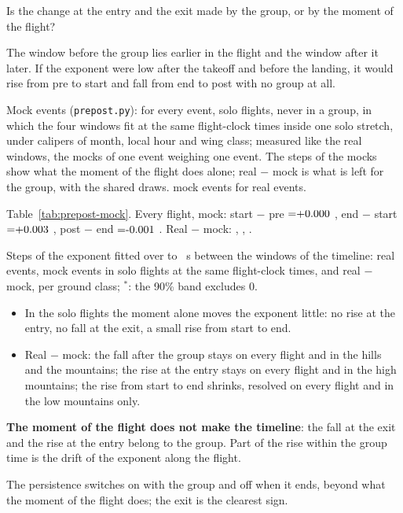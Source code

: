 \documentclass[10pt,a4paper]{article}
\newcommand{\Q}{\item[\textcolor{question}{\textbf{Q.}}]\color{question}}
\newcommand{\Res}{\item[\textcolor{answer}{\textbf{Result.}}]\color{black}}
\newcommand{\Home}{\item[\textcolor{answer}{\textbf{Take home.}}]\color{black}}
\newcommand{\Obs}{\item[\textcolor{answer}{\textbf{Observation.}}]\color{black}}
\newcommand{\Ded}{\item[\textcolor{answer}{\textbf{Deduction.}}]\color{black}}
\newcommand{\Why}{\item[\textcolor{black}{\textbf{Why.}}]\color{black}}
\newcommand{\Tool}{\item[\textcolor{black}{\textbf{Tool.}}]\color{black}}
\newenvironment{step}{\begin{description}[leftmargin=0pt, itemsep=7pt, topsep=8pt]}{\end{description}}
\begin{document}
\begin{step}
\Q Is the change at the entry and the exit made by the group, or by the moment of the flight?
\Why The window before the group lies earlier in the flight and the window after it later. If the exponent were
  low after the takeoff and before the landing, it would rise from pre to start and fall from end to post with no
  group at all.
\Tool Mock events (\texttt{prepost.py}): for every event, solo flights, never in a group, in which the four windows
  fit at the same flight-clock times inside one solo stretch, under calipers of month, local hour and wing class;
  measured like the real windows, the mocks of one event weighing one event. The steps of the mocks show what the
  moment of the flight does alone; real $-$ mock is what is left for the group, with the shared draws.
  \WhenMockEvents{} mock events for \WhenMockRealEvents{} real events.
\Res Table~\ref{tab:prepost-mock}. Every flight, mock: start $-$ pre $=\WhenMockAllStartMinusPre$
  \WhenMockAllStartMinusPreBand, end $-$ start $=\WhenMockAllEndMinusStart$ \WhenMockAllEndMinusStartBand, post $-$
  end $=\WhenMockAllPostMinusEnd$ \WhenMockAllPostMinusEndBand. Real $-$ mock: \WhenRealMinusMockAllStartMinusPre{}
  \WhenRealMinusMockAllStartMinusPreBand, \WhenRealMinusMockAllEndMinusStart{}
  \WhenRealMinusMockAllEndMinusStartBand, \WhenRealMinusMockAllPostMinusEnd{}
  \WhenRealMinusMockAllPostMinusEndBand.
  \begin{table}[H]
  \centering
  \resizebox{\textwidth}{!}{}
  \caption{Steps of the exponent fitted over \WhenLongLo{} to \WhenLongHi~s between the windows of the timeline: real
  events, mock events in solo flights at the same flight-clock times, and real $-$ mock, per ground class;
  $^*$: the 90\% band excludes 0.}
  \label{tab:prepost-mock}
  \end{table}
\Obs\mbox{}
  \begin{itemize}
  \item In the solo flights the moment alone moves the exponent little: no rise at the entry, no fall at the exit,
    a small rise from start to end.
  \item Real $-$ mock: the fall after the group stays on every flight and in the hills and the mountains; the rise
    at the entry stays on every flight and in the high mountains; the rise from start to end shrinks, resolved on
    every flight and in the low mountains only.
  \end{itemize}
\Ded \textbf{The moment of the flight does not make the timeline}: the fall at the exit and the rise at the entry
  belong to the group. Part of the rise within the group time is the drift of the exponent along the flight.
\Home The persistence switches on with the group and off when it ends, beyond what the moment of the flight does;
  the exit is the clearest sign.
\end{step}
\end{document}
